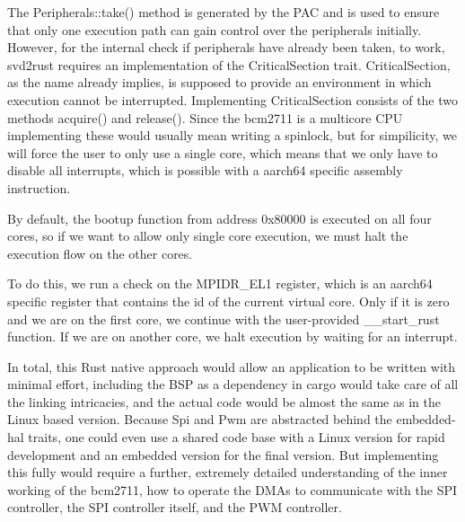 The Peripherals::take() method is generated by the PAC and is used to ensure that only one execution path can gain control over the peripherals initially.
However, for the internal check if peripherals have already been taken, to work, svd2rust requires an implementation of the CriticalSection trait.
CriticalSection, as the name already implies, is supposed to provide an environment in which execution cannot be interrupted.
Implementing CriticalSection consists of the two methods acquire() and release().
Since the bcm2711 is a multicore CPU implementing these would usually mean writing a spinlock,
but for simpilicity, we will force the user to only use a single core, which means that we only have to disable all interrupts,
which is possible with a aarch64 specific assembly instruction.



By default, the bootup function from address 0x80000 is executed on all four cores,
so if we want to allow only single core execution, we must halt the execution flow on the other cores.

To do this, we run a check on the MPIDR\_EL1 register, which is an aarch64 specific register that contains the id of the current virtual core.
Only if it is zero and we are on the first core, we continue with the user-provided \_\_start\_rust function.
If we are on another core, we halt execution by waiting for an interrupt.



In total, this Rust native approach would allow an application to be written with minimal effort,
including the BSP as a dependency in cargo would take care of all the linking intricacies,
and the actual code would be almost the same as in the Linux based version.
Because Spi and Pwm are abstracted behind the embedded-hal traits, one could even use a shared code base with a Linux version for rapid development
and an embedded version for the final version.
But implementing this fully would require a further, extremely detailed understanding of the inner working of the bcm2711,
how to operate the DMAs to communicate with the SPI controller, the SPI controller itself, and the PWM controller.
